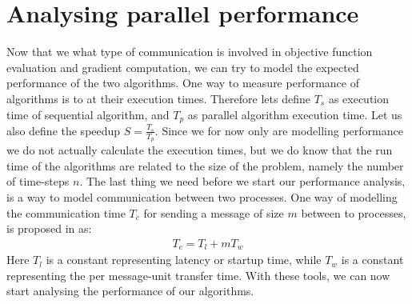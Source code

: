 \section{Analysing parallel performance}
Now that we what type of communication is involved in objective function evaluation and gradient computation, we can try to model the expected performance of the two algorithms. One way to measure performance of algorithms is to at their execution times. Therefore lets define $T_s$ as execution time of sequential algorithm, and $T_p$ as parallel algorithm execution time. Let us also define the speedup $S=\frac{T_s}{T_p}$. Since we for now only are modelling performance we do not actually calculate the execution times, but we do know that the run time of the algorithms are related to the size of the problem, namely the number of time-steps $n$. The last thing we need before we start our performance analysis, is a way to model communication between two processes. One way of modelling the communication time $T_c$ for sending a message of size $m$ between to processes, is proposed in \cite{grama2003introduction} as:
\begin{align*}
T_c = T_l + mT_w
\end{align*} 
Here $T_l$ is a constant representing latency or startup time, while $T_w$ is a constant representing the per message-unit transfer time. With these tools, we can now start analysing the performance of our algorithms.
